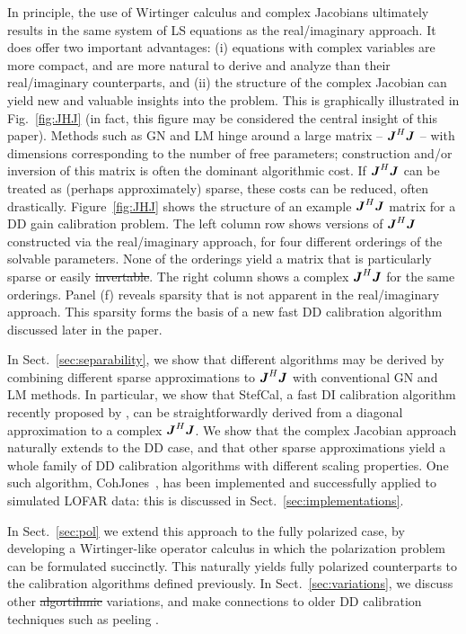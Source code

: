 \documentclass[useAMS,usenatbib]{mn2e}
\newcommand{\mat}[1]{{\bmath{#1}}}
\newcommand{\JJ}{\mat{J}} %
\newcommand{\JHJ}{\JJ^H\JJ} %
\newcommand{\COH}{{\sc CohJones}}
\newcommand{\StefCal}{{\sc StefCal}}
\numberwithin{equation}{section}
\providecommand{\DIFadd}[1]{{\protect\color{blue}\uwave{#1}}} %
\providecommand{\DIFdel}[1]{{\protect\color{red}\sout{#1}}}                      %
\providecommand{\DIFaddbegin}{} %
\providecommand{\DIFaddend}{} %
\providecommand{\DIFdelbegin}{} %
\providecommand{\DIFdelend}{} %
\begin{document}
In principle, the use of Wirtinger calculus and complex Jacobians ultimately results in the same system of LS 
equations as the real/imaginary approach. It does offer two important advantages: (i) equations with complex variables 
are more compact, and are more natural to derive and analyze than their real/imaginary counterparts, and (ii) the structure of the
complex Jacobian can yield new and valuable insights into the problem. This is graphically illustrated in 
Fig.~\ref{fig:JHJ} (in fact, this figure may be considered the central insight of this paper). Methods such as 
GN and LM hinge around a large matrix -- $\JHJ$ -- with dimensions corresponding to the number of 
free parameters; construction and/or inversion of this matrix is often the dominant algorithmic cost. If $\JHJ$ can
be treated as (perhaps approximately) sparse, these costs can be reduced, often drastically. Figure~\ref{fig:JHJ} 
shows the structure of an example $\JHJ$ matrix for a DD gain calibration problem. The left column row shows versions of
$\JHJ$ constructed via the real/imaginary approach, for four different orderings of the solvable parameters. None of
the orderings yield a matrix that is particularly sparse or easily \DIFdelbegin \DIFdel{invertable}\DIFdelend \DIFaddbegin \DIFadd{invertible}\DIFaddend . The right column shows a 
complex $\JHJ$ for the same orderings. Panel (f) reveals sparsity that is not apparent in the real/imaginary 
approach. This sparsity forms the basis of a new fast DD calibration algorithm discussed later in the paper.

In Sect.~\ref{sec:separability}, we show that different algorithms may be derived by combining 
different sparse approximations to $\JHJ$ with conventional GN and LM methods.  In particular, we show 
that \StefCal, a fast DI calibration algorithm recently proposed by \citet{Stefcal},
can be straightforwardly derived from a diagonal approximation to a complex $\JHJ$. We show that the 
complex Jacobian approach naturally extends to the DD case, and that other sparse approximations yield a whole family
of DD calibration algorithms with different scaling properties. One such algorithm, \COH\ \citep{Tasse-cohjones}, has been implemented 
and successfully applied to simulated LOFAR data: this is discussed in Sect.~\ref{sec:implementations}.

In Sect.~\ref{sec:pol} we extend this approach to the fully polarized case, by developing a Wirtinger-like 
operator calculus in which the polarization problem can be formulated succinctly. This naturally yields 
fully polarized counterparts to the calibration algorithms defined previously. In Sect.~\ref{sec:variations}, 
we discuss other \DIFdelbegin \DIFdel{algortihmic }\DIFdelend \DIFaddbegin \DIFadd{algorithmic }\DIFaddend variations, and make connections to older DD calibration techniques such as 
peeling \citep{JEN:peeling}. 
\end{document}
